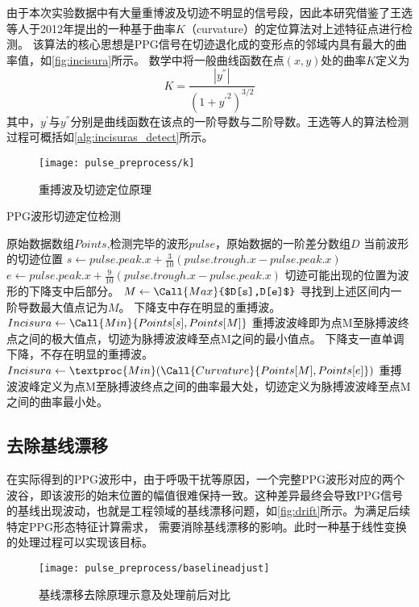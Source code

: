 由于本次实验数据中有大量重博波及切迹不明显的信号段，因此本研究借鉴了王选等人于2012年提出的一种基于曲率$K$（curvature）的定位算法对上述特征点进行检测\cite{Wang2012}。
该算法的核心思想是PPG信号在切迹退化成的变形点的邻域内具有最大的曲率值，如\autoref{fig:incisura}所示。
数学中将一般曲线函数在点$(x,y)$处的曲率$K$定义为
\begin{equation}
    \label{equ:curvature}
    K=\frac{|y^{''}|}{{(1+{y^{'}}^2)}^{3/2}}
\end{equation}
其中，$y^{'}$与$y^{''}$分别是曲线函数在该点的一阶导数与二阶导数。王选等人的算法检测过程可概括如\autoref{alg:incisuras_detect}所示\cite{Wang2012}。
\begin{figure}[htbp]
    \centering
    \texttt{[image: pulse\_preprocess/k]}
    \caption{\label{fig:incisura}重搏波及切迹定位原理}
\end{figure}

\begin{breakablealgorithm}
    \caption{PPG波形切迹定位检测}
    \label{alg:incisuras_detect}
    \begin{algorithmic}[1] %
        \Require 原始数据数组$Points$,检测完毕的波形$pulse$，原始数据的一阶差分数组$D$
        \Ensure 当前波形的切迹位置
            \State $s \gets pulse.peak.x + \frac{3}{10}(pulse.trough.x-pulse.peak.x)$
            \State $e \gets pulse.peak.x + \frac{9}{10}(pulse.trough.x-pulse.peak.x)$
            \State \Comment 切迹可能出现的位置为波形的下降支中后部分。
            \State $M  \gets \Call{Max}{$D[s],D[e]$}$
            \State \Comment 寻找到上述区间内一阶导数最大值点记为$M$。
                \State \Comment 下降支中存在明显的重搏波。
                \State $Incisura \gets \Call{Min}{Points[s],Points[M]}$
                \State \Comment 重搏波波峰即为点M至脉搏波终点之间的极大值点，切迹为脉搏波波峰至点M之间的最小值点。
            \Else
                \State \Comment 下降支一直单调下降，不存在明显的重搏波。
                \State $Incisura \gets \textproc{Min}({\Call{Curvature}{Points[M],Points[e]}})$
                \State \Comment 重搏波波峰定义为点M至脉搏波终点之间的曲率最大处，切迹定义为脉搏波波峰至点M之间的曲率最小处。
            \EndIf
            \State {}
        \EndFunction
    \end{algorithmic}
\end{breakablealgorithm}

\subsection{去除基线漂移}
在实际得到的PPG波形中，由于呼吸干扰等原因，一个完整PPG波形对应的两个波谷，即该波形的始末位置的幅值很难保持一致。这种差异最终会导致PPG信号的基线出现波动，也就是工程领域的基线漂移问题，如\autoref{fig:drift}所示。为满足后续特定PPG形态特征计算需求，
需要消除基线漂移的影响。此时一种基于线性变换的处理过程可以实现该目标。
\begin{figure}[htbp]
    \centering
    \texttt{[image: pulse\_preprocess/baselineadjust]}
    \caption{\label{fig:drift}基线漂移去除原理示意及处理前后对比}
\end{figure}

